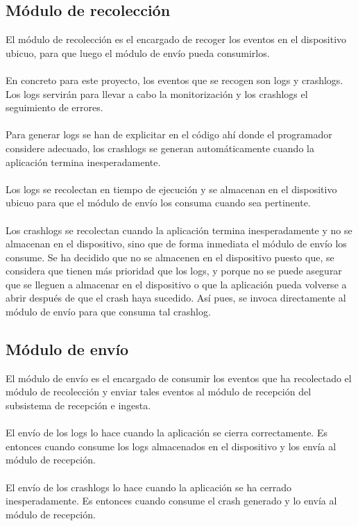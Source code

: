 \subsection{Módulo de recolección}
El módulo de recolección es el encargado de recoger los eventos en el dispositivo ubicuo, para que luego el módulo de envío pueda consumirlos. 
\\\\
En concreto para este proyecto, los eventos que se recogen son logs y crashlogs. Los logs servirán para llevar a cabo la monitorización y los crashlogs el seguimiento de errores.
\\\\
Para generar logs se han de explicitar en el código ahí donde el programador considere adecuado, los crashlogs se generan automáticamente cuando la aplicación termina inesperadamente.
\\\\
Los logs se recolectan en tiempo de ejecución y se almacenan en el dispositivo ubicuo para que el módulo de envío los consuma cuando sea pertinente.
\\\\
Los crashlogs se recolectan cuando la aplicación termina inesperadamente y no se almacenan en el dispositivo, sino que de forma inmediata el módulo de envío los consume. Se ha decidido que no se almacenen en el dispositivo puesto que, se considera que tienen más prioridad que los logs, y porque no se puede asegurar que se lleguen a almacenar en el dispositivo o que la aplicación pueda volverse a abrir después de que el crash haya sucedido. Así pues, se invoca directamente al módulo de envío para que consuma tal crashlog.

\subsection{Módulo de envío}
El módulo de envío es el encargado de consumir los eventos que ha recolectado el módulo de recolección y enviar tales eventos al módulo de recepción del subsistema de recepción e ingesta.
\\\\
El envío de los logs lo hace cuando la aplicación se cierra correctamente. Es entonces cuando consume los logs almacenados en el dispositivo y los envía al módulo de recepción.
\\\\
El envío de los crashlogs lo hace cuando la aplicación se ha cerrado inesperadamente. Es entonces cuando consume el crash generado y lo envía al módulo de recepción.

